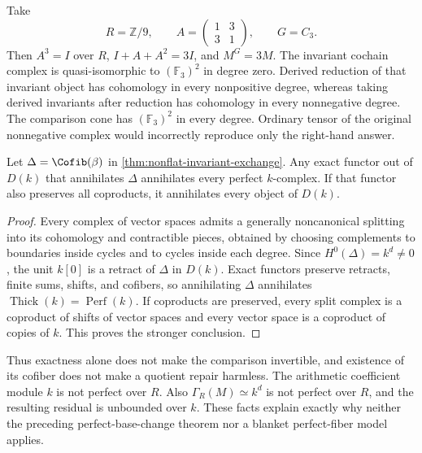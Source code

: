 \begin{example}\label{ex:nine-invariants}
Take
\[
 R=\mathbb Z/9,\qquad
 A=\begin{pmatrix}1&3\\3&1\end{pmatrix},\qquad G=C_3.
\]
Then $A^3=I$ over $R$, $I+A+A^2=3I$, and $M^G=3M$. The invariant cochain complex is quasi-isomorphic to $(\mathbb F_3)^2$ in degree zero. Derived reduction of that invariant object has cohomology in every nonpositive degree, whereas taking derived invariants after reduction has cohomology in every nonnegative degree. The comparison cone has $(\mathbb F_3)^2$ in every degree. Ordinary tensor of the original nonnegative complex would incorrectly reproduce only the right-hand answer.
\end{example}

\begin{corollary}\label{cor:intrinsic-unit-loss}
Let $\Delta=\Cofib(\beta)$ in \cref{thm:nonflat-invariant-exchange}. Any exact functor out of $D(k)$ that annihilates $\Delta$ annihilates every perfect $k$-complex. If that functor also preserves all coproducts, it annihilates every object of $D(k)$.
\end{corollary}
\begin{proof}
Every complex of vector spaces admits a generally noncanonical splitting into its cohomology and contractible pieces, obtained by choosing complements to boundaries inside cycles and to cycles inside each degree. Since $H^0(\Delta)=k^d\ne0$, the unit $k[0]$ is a retract of $\Delta$ in $D(k)$. Exact functors preserve retracts, finite sums, shifts, and cofibers, so annihilating $\Delta$ annihilates $\operatorname{Thick}(k)=\operatorname{Perf}(k)$. If coproducts are preserved, every split complex is a coproduct of shifts of vector spaces and every vector space is a coproduct of copies of $k$. This proves the stronger conclusion.
\end{proof}

Thus exactness alone does not make the comparison invertible, and existence of its cofiber does not make a quotient repair harmless. The arithmetic coefficient module $k$ is not perfect over $R$. Also $\Gamma_R(M)\simeq k^d$ is not perfect over $R$, and the resulting residual is unbounded over $k$. These facts explain exactly why neither the preceding perfect-base-change theorem nor a blanket perfect-fiber model applies.

